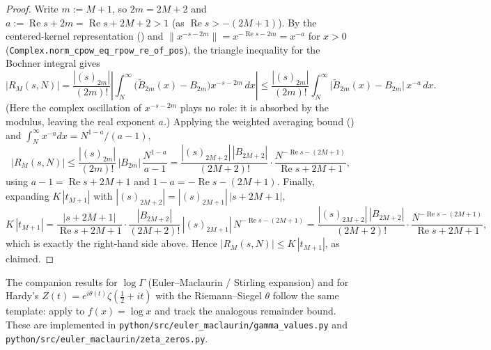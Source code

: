 \begin{proof}
\leanok
{}
Write $m := M+1$, so $2m = 2M+2$ and $a := \operatorname{Re} s + 2m = \operatorname{Re} s + 2M+2
> 1$ (as $\operatorname{Re} s > -(2M+1)$). By the centered-kernel representation
() and $\|x^{-s-2m}\| = x^{-\operatorname{Re} s - 2m} = x^{-a}$ for
$x > 0$ (\texttt{Complex.norm\_cpow\_eq\_rpow\_re\_of\_pos}), the triangle inequality for the
Bochner integral gives
\[
  \bigl|R_M(s,N)\bigr|
  = \frac{|(s)_{2m}|}{(2m)!}\left|\int_N^{\infty}\bigl(\widetilde{B}_{2m}(x)-B_{2m}\bigr)x^{-s-2m}\,dx\right|
  \le \frac{|(s)_{2m}|}{(2m)!}\int_N^{\infty}\bigl|\widetilde{B}_{2m}(x)-B_{2m}\bigr|\,x^{-a}\,dx .
\]
(Here the complex oscillation of $x^{-s-2m}$ plays no role: it is absorbed by the modulus,
leaving the real exponent $a$.) Applying the weighted averaging bound
() and $\int_N^{\infty} x^{-a}dx = N^{1-a}/(a-1)$,
\[
  \bigl|R_M(s,N)\bigr|
  \le \frac{|(s)_{2m}|}{(2m)!}\,|B_{2m}|\,\frac{N^{1-a}}{a-1}
  = \frac{|(s)_{2M+2}|\,|B_{2M+2}|}{(2M+2)!}\cdot\frac{N^{-\operatorname{Re} s-(2M+1)}}{\operatorname{Re} s+2M+1},
\]
using $a - 1 = \operatorname{Re} s + 2M+1$ and $1 - a = -\operatorname{Re} s - (2M+1)$. Finally,
expanding $K\,|t_{M+1}|$ with $|(s)_{2M+2}| = |(s)_{2M+1}|\,|s+2M+1|$,
\[
  K\,|t_{M+1}|
  = \frac{|s+2M+1|}{\operatorname{Re} s+2M+1}\cdot\frac{|B_{2M+2}|}{(2M+2)!}\,|(s)_{2M+1}|\,N^{-\operatorname{Re} s-(2M+1)}
  = \frac{|(s)_{2M+2}|\,|B_{2M+2}|}{(2M+2)!}\cdot\frac{N^{-\operatorname{Re} s-(2M+1)}}{\operatorname{Re} s+2M+1},
\]
which is exactly the right-hand side above. Hence $|R_M(s,N)| \le K\,|t_{M+1}|$, as claimed.
\end{proof}

\begin{remark}
\label{rem:log_gamma}
The companion results for $\log\Gamma$ (Euler--Maclaurin / Stirling expansion) and
for Hardy's $Z(t) = e^{i\theta(t)}\zeta(\tfrac12+it)$ with the Riemann--Siegel
$\theta$ follow the same template: apply  to
$f(x) = \log x$ and track the analogous remainder bound. These are implemented in
\texttt{python/src/euler\_maclaurin/gamma\_values.py} and
\texttt{python/src/euler\_maclaurin/zeta\_zeros.py}.
\end{remark}
